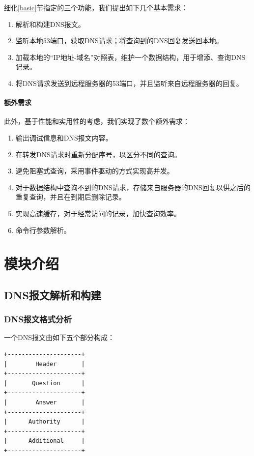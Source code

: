 \documentclass[lang=cn,11pt,a4paper,cite=authornum]{paper}
\begin{document}
细化\ref{basic}节指定的三个功能，我们提出如下几个基本需求：

\begin{enumerate}
    \item 解析和构建DNS报文。
    \item 监听本地53端口，获取DNS请求；将查询到的DNS回复发送回本地。
    \item 加载本地的“IP地址-域名”对照表，维护一个数据结构，用于增添、查询DNS记录。
    \item 将DNS请求发送到远程服务器的53端口，并且监听来自远程服务器的回复。
\end{enumerate}

\paragraph{额外需求}

此外，基于性能和实用性的考虑，我们实现了数个额外需求：

\begin{enumerate}
    \item 输出调试信息和DNS报文内容。
    \item 在转发DNS请求时重新分配序号，以区分不同的查询。
    \item 避免阻塞式查询，采用事件驱动的方式实现高并发。
    \item 对于数据结构中查询不到的DNS请求，存储来自服务器的DNS回复以供之后的重复查询，并且在到期后删除记录。
    \item 实现高速缓存，对于经常访问的记录，加快查询效率。
    \item 命令行参数解析。
\end{enumerate}

\section{模块介绍}

\subsection{DNS报文解析和构建}

\subsubsection{DNS报文格式分析}

一个DNS报文由如下五个部分构成：

\begin{code}
\begin{verbatim}
+---------------------+
|        Header       |
+---------------------+
|       Question      |
+---------------------+
|        Answer       |
+---------------------+
|      Authority      |
+---------------------+
|      Additional     |
+---------------------+
\end{verbatim}
\end{code}
\end{document}
